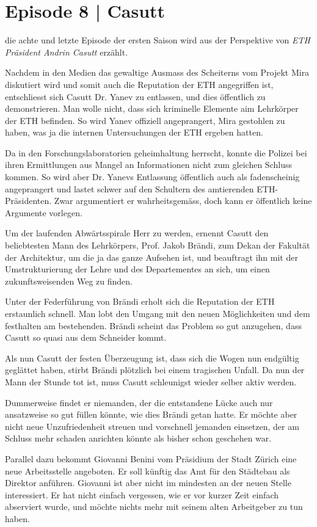 \documentclass[11pt,a4paper,ngerman]{scrreprt}
\begin{document}
\section*{Episode 8 | Casutt}

die achte und letzte Episode der ersten Saison wird aus der Perspektive von \emph{ETH
Präsident Andrin Casutt} erzählt.

Nachdem in den Medien das gewaltige Ausmass des Scheiterns vom Projekt Mira
diskutiert wird und somit auch die Reputation der ETH angegriffen ist,
entschliesst sich Casutt Dr. Yanev zu entlassen, und dies öffentlich zu
demonstrieren. Man wolle nicht, dass sich kriminelle Elemente aim Lehrkörper der
ETH befinden. So wird Yanev offiziell angeprangert, Mira gestohlen zu haben, was
ja die internen Untersuchungen der ETH ergeben hatten.

Da in den Forschungslaboratorien geheimhaltung herrscht, konnte die Polizei bei
ihren Ermittlungen aus Mangel an Informationen nicht zum gleichen Schluss
kommen. So wird aber Dr. Yanevs Entlassung öffentlich auch als fadenscheinig
angeprangert und lastet schwer auf den Schultern des amtierenden
ETH-Präsidenten. Zwar argumentiert er wahrheitsgemäss, doch kann er öffentlich
keine Argumente vorlegen.

Um der laufenden Abwärtsspirale Herr zu werden, ernennt Casutt den
beliebtesten Mann des Lehrkörpers, Prof. Jakob Brändi, zum Dekan der Fakultät der
Architektur, um die ja das ganze Aufsehen ist, und beauftragt ihn mit der
Umstrukturierung der Lehre und des Departementes an sich, um einen
zukunftsweisenden Weg zu finden.

Unter der Federführung von Brändi erholt sich die Reputation der ETH erstaunlich
schnell. Man lobt den Umgang mit den neuen Möglichkeiten und dem festhalten am
bestehenden. Brändi scheint das Problem so gut anzugehen, dass Casutt so quasi
aus dem Schneider kommt.

Als nun Casutt der festen Überzeugung ist, dass sich die Wogen nun endgültig
geglättet haben, stirbt Brändi plötzlich bei einem tragischen Unfall. Da nun der
Mann der Stunde tot ist, muss Casutt schleunigst wieder selber aktiv werden.

Dummerweise findet er niemanden, der die entstandene Lücke auch nur ansatzweise
so gut füllen könnte, wie dies Brändi getan hatte. Er möchte aber nicht neue
Unzufriedenheit streuen und vorschnell jemanden einsetzen, der am Schluss mehr
schaden anrichten könnte als bisher schon geschehen war.

Parallel dazu bekommt Giovanni Benini vom Präsidium der Stadt Zürich eine neue
Arbeitsstelle angeboten. Er soll künftig das Amt für den Städtebau als Direktor
anführen. Giovanni ist aber nicht im mindesten an der neuen Stelle
interessiert. Er hat nicht einfach vergessen, wie er vor kurzer Zeit einfach
abserviert wurde, und möchte nichts mehr mit seinem alten Arbeitgeber zu tun
haben.
\end{document}
